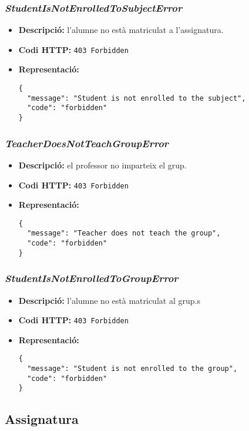 \subsubsection{\emph{StudentIsNotEnrolledToSubjectError}}
\begin{itemize}
	\item \textbf{Descripció:} l'alumne no està matriculat a l'assignatura.
	\item \textbf{Codi \ac{HTTP}:} \texttt{403 Forbidden}
	\item \textbf{Representació:}
\begin{verbatim}
{
  "message": "Student is not enrolled to the subject",
  "code": "forbidden"
}
\end{verbatim}
\end{itemize}

\subsubsection{\emph{TeacherDoesNotTeachGroupError}}
\begin{itemize}
	\item \textbf{Descripció:} el professor no imparteix el grup.
	\item \textbf{Codi \ac{HTTP}:} \texttt{403 Forbidden}
	\item \textbf{Representació:}
\begin{verbatim}
{
  "message": "Teacher does not teach the group",
  "code": "forbidden"
}
\end{verbatim}
\end{itemize}
\subsubsection{\emph{StudentIsNotEnrolledToGroupError}}
\begin{itemize}
	\item \textbf{Descripció:} l'alumne no està matriculat al grup.s
	\item \textbf{Codi \ac{HTTP}:} \texttt{403 Forbidden}
	\item \textbf{Representació:}
\begin{verbatim}
{
  "message": "Student is not enrolled to the group",
  "code": "forbidden"
}
\end{verbatim}
\end{itemize}

\subsection{Assignatura}
